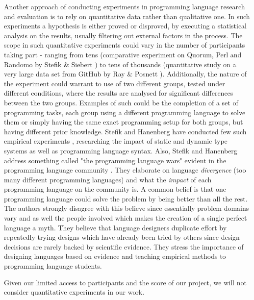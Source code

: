 Another approach of conducting experiments in programming language research and evaluation is to rely on quantitative data rather than qualitative one. In such experiments a hypothesis is either proved or disproved, by executing a statistical analysis on the results, usually filtering out external factors in the process. The scope in such quantitative experiments could vary in the number of participants taking part - ranging from tens (comparative experiment on Quorum, Perl and Randomo by Stefik \& Siebert \cite{QuorumRandomo}) to tens of thousands (quantitative study on a very large data set from GitHub by Ray \& Posnett \cite{GitHubExperiment}). Additionally, the nature of the experiment could warrant to use of two different groups, tested under different conditions, where the results are analysed for significant differences between the two groups. Examples of such could be the completion of a set of programming tasks, each group using a different programming language to solve them or simply having the same exact programming setup for both groups, but having different prior knowledge. Stefik and Hanenberg have conducted few such empirical experiments \cite{StaticTypes},\cite{ProgLangSyntax} researching the impact of static and dynamic type systems as well as programming language syntax. Also, Stefik and Hanenberg address something called "the programming language wars" evident in the programming language community \cite{ProgrammingWars}. They elaborate on language \textit{divergence} (too many different programming languages) and what the \textit{impact} of each programming language on the community is. A common belief is that one programming language could solve the problem by being better than all the rest. The authors strongly disagree with this believe since essentially problem domains vary and as well the people involved which makes the creation of a single perfect language a myth. They believe that language designers duplicate effort by repeatedly trying designs which have already been tried by others since design decisions are rarely backed by scientific evidence. They stress the importance of designing languages based on evidence and teaching empirical methods to programming language students.

 Given our limited access to participants and the score of our project, we will not consider quantitative experiments in our work.